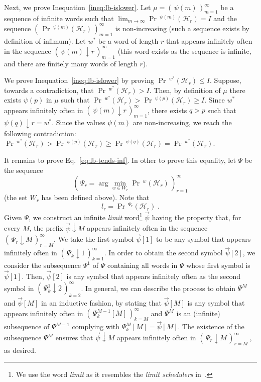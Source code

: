 \documentclass[final,3p,times,twocolumn]{elsarticle}
\theoremstyle{plain}
\theoremstyle{definition}
\newcommand{\fword}{w}
\newcommand{\infimum}{I}
\newcommand{\phit}{\mathcal{H}}
\newcommand{\iword}{\psi}
\DeclareMathOperator{\prWord}{Pr}
\newcommand{\lb}{l}
\newcommand{\iter}{r}
\newcommand{\recallEquation}[1]{Eq.~\ref{#1}}
\newcommand{\wprefix}[2]{\text{${#1}\!\!\downarrow\!\!{#2}$}}
\newcommand{\limword}{\vec{\iword}}
\newcommand{\recallInequation}[1]{Inequation~\ref{#1}}
\newcommand{\pr}{\prWord\,\!}
\begin{document}
Next, we prove \recallInequation{ineq:lb-islower}. Let
$\mu = ( \, \iword(m) \, )_{m=1}^{\infty}$ be a sequence of
infinite words such that
$\lim_{m \to \infty} \pr^{\iword(m)}(\phit_{\iter}) = \infimum$
and the sequence $( \, \pr^{\iword(m)}(\phit_{\iter}) \, )_{m=1}^{\infty}$
is non-increasing (such a sequence exists by definition of infimum). Let
$\fword^{*}$ be a word of length $\iter$ that appears infinitely often in the
sequence $( \, \wprefix{\iword(m)}{\iter} \, )_{m=1}^{\infty}$ (this word
exists as the sequence is infinite, and there are finitely many words of
length $\iter$).

We prove \recallInequation{ineq:lb-islower} by proving
$\pr^{\fword^{*}}(\phit_{\iter}) \leq \infimum$. Suppose, towards a
contradiction, that $\pr^{\fword^{*}}(\phit_{\iter}) > \infimum$. Then,
by definition of $\mu$ there exists $\iword(p)$ in $\mu$ such that
$\pr^{\fword^{*}}(\phit_{\iter}) > \pr^{\iword(p)}(\phit_{\iter})
															\geq \infimum$.
Since $\fword^{*}$ appears infinitely often in
$( \, \wprefix{\iword(m)}{\iter} \, )_{m=1}^{\infty}$, there exists
$q > p$ such that $\wprefix{\iword(q)}{\iter} = \fword^{*}$. Since
the values $\iword(m)$ are non-increasing, we reach the following
contradiction:
$\pr^{\fword^{*}}(\phit_{\iter})
	> \pr^{\iword(p)}(\phit_{\iter})
	\geq \pr^{\iword(q)}(\phit_{\iter})
	= \pr^{\fword^{*}}(\phit_{\iter})$.


It remains to prove \recallEquation{eq:lb-tends-inf}. In
other to prove this equality, let
$\Psi$ be the sequence
\[ ( \, \Psi_{\iter} =  \arg \min_{\fword \in W_{\iter}}
											\pr^{\fword}(\phit_{\iter})
							\, )_{\iter=1}^{\infty} \]
(the set $W_{\iter}$ has been defined above). Note that
\begin{equation}
\label{eq:alt-def-lb}
\lb_{\iter} = \pr^{\Psi_{\iter}}(\phit_{\iter}) \; .
\end{equation} 
Given $\Psi$, we construct an infinite \emph{limit} word\footnote{We use the word
\emph{limit} as it resembles the \emph{limit schedulers}
in~\cite{DBLP:journals/entcs/GiroD09}.} $\limword$ having the property that,
for every $M$, the prefix $\wprefix{\limword}{M}$ appears infinitely often in
the sequence $( \, \wprefix{\Psi_{\iter}}{M} \, )_{\iter=M}^{\infty}$.
We take the first symbol $\limword[1]$ to be any symbol that appears
infinitely often in $( \, \wprefix{\Psi_{k}}{1} \, )_{k=1}^{\infty}$.
In order to obtain the second symbol $\limword[2]$, we consider
the subsequence $\Psi^{1}$ of $\Psi$ containing all words in $\Psi$ whose
first symbol is $\limword[1]$. Then, $\limword[2]$ is any symbol
that appears infinitely often as the second symbol in 
$( \, \wprefix{\Psi^{1}_{k}}{2} \, )_{k=2}^{\infty}$. In general, we can
describe the process to obtain $\Psi^{M}$ and $\limword[M]$
in an inductive fashion,  by stating that $\limword[M]$ is any symbol that
appears infinitely often in $( \, \Psi^{M-1}_{k}[M] \, )_{k=M}^{\infty}$ and
$\Psi^{M}$ is an (infinite) subsequence of $\Psi^{M-1}$ complying with
$\Psi^{M}_{k}[M] = \limword[M]$. The existence of the subsequence $\Psi^{M}$ 
ensures that $\wprefix{\limword}{M}$ appears infinitely often in
$( \, \wprefix{\Psi_{\iter}}{M} \, )_{\iter=M}^{\infty} \:$, as desired.
\end{document}
